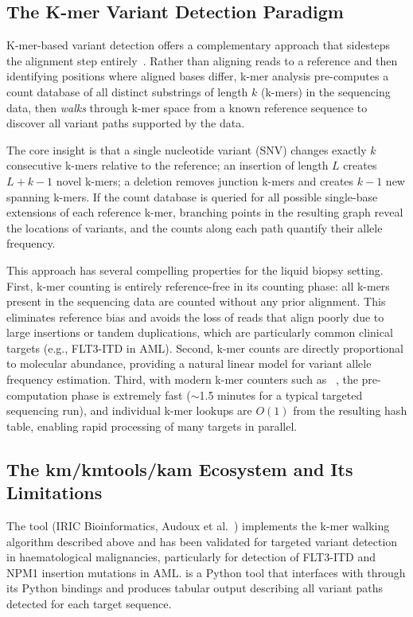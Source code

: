 \subsection{The K-mer Variant Detection Paradigm}

K-mer-based variant detection offers a complementary approach that sidesteps
the alignment step entirely~\cite{audoux2017km,audoux2020km}.  Rather than
aligning reads to a reference and then identifying positions where aligned
bases differ, k-mer analysis pre-computes a count database of all distinct
substrings of length $k$ (k-mers) in the sequencing data, then \emph{walks}
through k-mer space from a known reference sequence to discover all variant
paths supported by the data.

The core insight is that a single nucleotide variant (SNV) changes exactly $k$
consecutive k-mers relative to the reference; an insertion of length $L$ creates
$L + k - 1$ novel k-mers; a deletion removes junction k-mers and creates $k - 1$
new spanning k-mers.  If the count database is queried for all possible single-base
extensions of each reference k-mer, branching points in the resulting graph
reveal the locations of variants, and the counts along each path quantify their
allele frequency.

This approach has several compelling properties for the liquid biopsy setting.
First, k-mer counting is entirely reference-free in its counting phase: all
k-mers present in the sequencing data are counted without any prior alignment.
This eliminates reference bias and avoids the loss of reads that align poorly
due to large insertions or tandem duplications, which are particularly common
clinical targets (e.g., FLT3-ITD in AML).  Second, k-mer counts are directly
proportional to molecular abundance, providing a natural linear model for
variant allele frequency estimation.  Third, with modern k-mer counters such as
\jf{}~\cite{marcais2011fast}, the pre-computation phase is extremely fast
($\sim$1.5 minutes for a typical targeted sequencing run), and individual k-mer
lookups are $O(1)$ from the resulting hash table, enabling rapid processing of
many targets in parallel.

\subsection{The km/kmtools/kam Ecosystem and Its Limitations}

The \km{} tool (IRIC Bioinformatics, Audoux et al.~\cite{audoux2017km,audoux2020km})
implements the k-mer walking algorithm described above and has been validated for
targeted variant detection in haematological malignancies, particularly for
detection of FLT3-ITD and NPM1 insertion mutations in AML.  \km{} is a
Python tool that interfaces with \jf{} through its Python bindings and produces
tabular output describing all variant paths detected for each target sequence.

